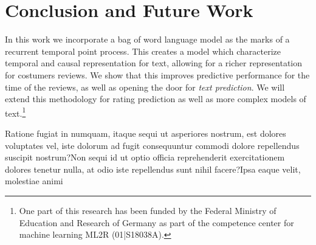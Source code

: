 \documentclass[letterpaper]{article} %
\newcommand{\+}[1]{\boldsymbol{\mathbf{#1}}}
\begin{document}
\section{Conclusion and Future Work}
In this work we incorporate a bag of word language model as the marks of a recurrent temporal point process. This creates a model which characterize temporal and causal representation for text, allowing for a richer representation for costumers reviews. We show that this improves predictive performance for the time of the reviews, as well as opening the door for \textit{text prediction}. We will extend this methodology for rating prediction as well as more complex models of text.\footnote{One part of this research has been funded by the Federal Ministry of Education and Research of Germany as part of the competence center for machine learning ML2R (01|S18038A).}

Ratione fugiat in numquam, itaque sequi ut asperiores nostrum, est dolores voluptates vel, iste dolorum ad fugit consequuntur commodi dolore repellendus suscipit nostrum?Non sequi id ut optio officia reprehenderit exercitationem dolores tenetur nulla, at odio iste repellendus sunt nihil facere?Ipsa eaque velit, molestiae animi

\end{document}
